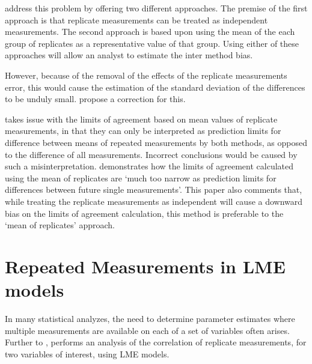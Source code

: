 \documentclass[12pt, a4paper]{report}
\theoremstyle{plain}
\theoremstyle{definition}
\theoremstyle{remark}
\begin{document}
	\citet*{BA86} address this problem by offering two different
	approaches. The premise of the first approach is that replicate
	measurements can be treated as independent measurements. The
	second approach is based upon using the mean of the each group of
	replicates as a representative value of that group. Using either
	of these approaches will allow an analyst to estimate the inter
	method bias.
	
	
	However, because of the removal of the effects of the replicate
	measurements error, this would cause the estimation of the
	standard deviation of the differences to be unduly small.
	\citet*{BA86} propose a correction for this.
	
	\citet{BXC2008} takes issue with the limits of agreement based on
	mean values of replicate measurements, in that they can only be interpreted as prediction
	limits for difference between means of repeated measurements by
	both methods, as opposed to the difference of all measurements.
	Incorrect conclusions would be caused by such a misinterpretation.
	\citet{BXC2008} demonstrates how the limits of agreement
	calculated using the mean of replicates are `much too narrow as
	prediction limits for differences between future single
	measurements'. This paper also comments that, while treating the
	replicate measurements as independent will cause a downward bias
	on the limits of agreement calculation, this method is preferable
	to the `mean of replicates' approach.
	
	
	
	
	
	
	
	
	\section{Repeated Measurements in LME models}
	
	In many statistical analyzes, the need to determine parameter estimates where multiple measurements are available on each of a set of variables often arises. Further to \citet{lam}, \citet{hamlett} performs an analysis of the correlation of replicate measurements, for two variables of interest, using LME models.
	
\end{document}
